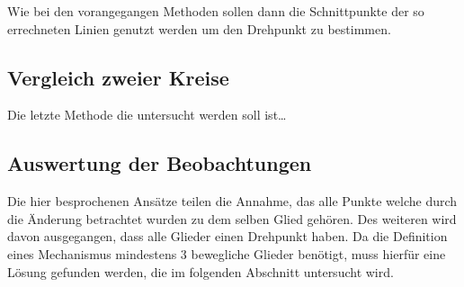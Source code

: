
Wie bei den vorangegangen Methoden sollen dann die Schnittpunkte der so errechneten Linien genutzt werden um den Drehpunkt zu bestimmen.

\subsection{Vergleich zweier Kreise}

Die letzte Methode die untersucht werden soll ist\dots

\subsection{Auswertung der Beobachtungen}


Die hier besprochenen Ansätze teilen die Annahme, das alle Punkte welche durch die Änderung betrachtet wurden zu dem selben Glied gehören.
Des weiteren wird davon ausgegangen, dass alle Glieder einen Drehpunkt haben.
Da die Definition eines Mechanismus mindestens 3 bewegliche Glieder benötigt, muss hierfür eine Lösung gefunden werden, die im folgenden Abschnitt untersucht wird.

